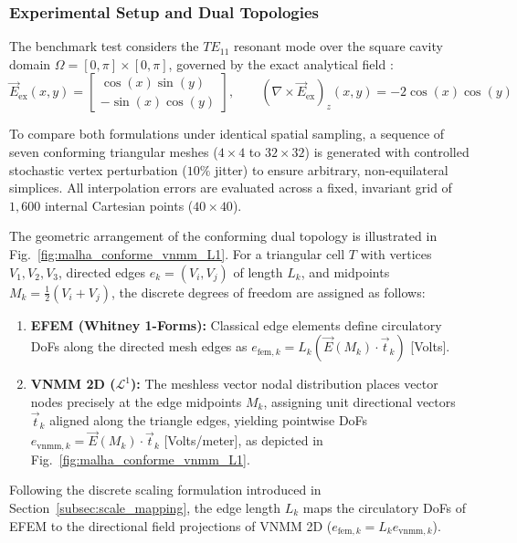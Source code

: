 \documentclass[preprint,12pt]{elsarticle}
\begin{document}
\subsubsection{Experimental Setup and Dual Topologies}
The benchmark test considers the $TE_{11}$ resonant mode over the square cavity domain $\Omega = [0, \pi] \times [0, \pi]$, governed by the exact analytical field \cite{harrington2001time, jin2014finite}:
\begin{equation}
\vec{E}_{\mathrm{ex}}(x, y) = \begin{bmatrix} \cos(x) \sin(y) \\[2pt] -\sin(x) \cos(y) \end{bmatrix}, \qquad (\nabla \times \vec{E}_{\mathrm{ex}})_z(x, y) = -2 \cos(x) \cos(y)
\label{eq:analytical_te11_field}
\end{equation}

To compare both formulations under identical spatial sampling, a sequence of seven conforming triangular meshes ($4\times4$ to $32\times32$) is generated with controlled stochastic vertex perturbation ($10\%$ jitter) to ensure arbitrary, non-equilateral simplices. All interpolation errors are evaluated across a fixed, invariant grid of $1{,}600$ internal Cartesian points ($40 \times 40$).

The geometric arrangement of the conforming dual topology is illustrated in Fig.~\ref{fig:malha_conforme_vnmm_L1}. For a triangular cell $T$ with vertices $V_1, V_2, V_3$, directed edges $e_k = (V_i, V_j)$ of length $L_k$, and midpoints $M_k = \frac{1}{2}(V_i + V_j)$, the discrete degrees of freedom are assigned as follows:
\begin{enumerate}
    \item \textbf{EFEM (Whitney 1-Forms):} Classical edge elements define circulatory DoFs along the directed mesh edges as $e_{\mathrm{fem}, k} = L_k (\vec{E}(M_k) \cdot \vec{t}_k)$ [Volts].
    \item \textbf{VNMM 2D ($\mathcal{L}^1$):} The meshless vector nodal distribution places vector nodes precisely at the edge midpoints $M_k$, assigning unit directional vectors $\vec{t}_k$ aligned along the triangle edges, yielding pointwise DoFs $e_{\mathrm{vnmm}, k} = \vec{E}(M_k) \cdot \vec{t}_k$ [Volts/meter], as depicted in Fig.~\ref{fig:malha_conforme_vnmm_L1}.
\end{enumerate}

Following the discrete scaling formulation introduced in Section~\ref{subsec:scale_mapping}, the edge length $L_k$ maps the circulatory DoFs of EFEM to the directional field projections of VNMM 2D ($e_{\mathrm{fem}, k}= L_k e_{\mathrm{vnmm}, k}$).
\end{document}
